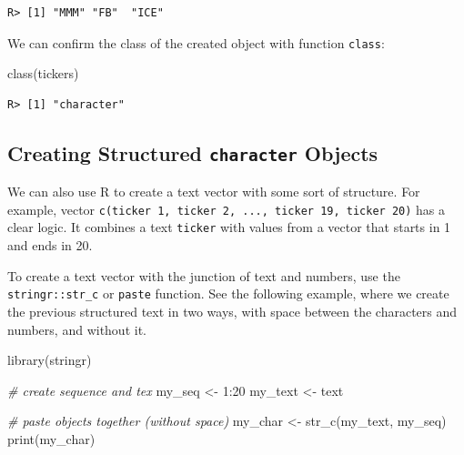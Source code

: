 \documentclass[
  12pt,
]{book}
\newenvironment{Shaded}{\begin{snugshade}}{\end{snugshade}}
\newcommand{\CommentTok}[1]{\textcolor[rgb]{0.37,0.37,0.37}{\textit{#1}}}
\newcommand{\DecValTok}[1]{\textcolor[rgb]{0.06,0.06,0.06}{#1}}
\newcommand{\FunctionTok}[1]{\textcolor[rgb]{0,0,0}{#1}}
\newcommand{\NormalTok}[1]{#1}
\newcommand{\OtherTok}[1]{\textcolor[rgb]{0.37,0.37,0.37}{#1}}
\newcommand{\SpecialCharTok}[1]{\textcolor[rgb]{0,0,0}{#1}}
\newcommand{\StringTok}[1]{\textcolor[rgb]{0.5,0.5,0.5}{#1}}
\begin{document}
\begin{verbatim}
R> [1] "MMM" "FB"  "ICE"
\end{verbatim}

We can confirm the class of the created object with function \texttt{class}: 

\begin{Shaded}
\begin{Highlighting}[]
\FunctionTok{class}\NormalTok{(tickers)}
\end{Highlighting}
\end{Shaded}

\begin{verbatim}
R> [1] "character"
\end{verbatim}

\hypertarget{creating-structured-character-objects}{%
\subsection{\texorpdfstring{Creating Structured \texttt{character} Objects}{Creating Structured character Objects}}\label{creating-structured-character-objects}}

We can also use R to create a text vector with some sort of structure. For example, vector \texttt{c(\textquotesingle{}ticker\ 1\textquotesingle{},\ \textquotesingle{}ticker\ 2\textquotesingle{},\ ...,\ \textquotesingle{}ticker\ 19\textquotesingle{},\ \textquotesingle{}ticker\ 20\textquotesingle{})} has a clear logic. It combines a text \texttt{ticker} with values from a vector that starts in 1 and ends in 20.

To create a text vector with the junction of text and numbers, use the \texttt{stringr::str\_c} or \texttt{paste} function. See the following example, where we create the previous structured text in two ways, with space between the characters and numbers, and without it.  

\begin{Shaded}
\begin{Highlighting}[]
\FunctionTok{library}\NormalTok{(stringr)}

\CommentTok{\# create sequence and tex}
\NormalTok{my\_seq }\OtherTok{\textless{}{-}} \DecValTok{1}\SpecialCharTok{:}\DecValTok{20}
\NormalTok{my\_text }\OtherTok{\textless{}{-}} \StringTok{\textquotesingle{}text\textquotesingle{}}

\CommentTok{\# paste objects together (without space)}
\NormalTok{my\_char }\OtherTok{\textless{}{-}} \FunctionTok{str\_c}\NormalTok{(my\_text, my\_seq)}
\FunctionTok{print}\NormalTok{(my\_char)}
\end{Highlighting}
\end{Shaded}
\end{document}
